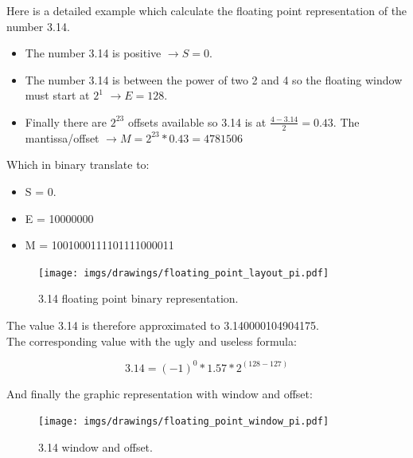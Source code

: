 \documentclass[book.tex]{subfiles}
\begin{document}
Here is a detailed example which calculate the floating point representation of the number 3.14.
\begin{itemize}
 \item The number 3.14 is positive  $\rightarrow S=0$.
 \item The number 3.14 is between the power of two 2 and 4 so the floating window must start at $2^1$  $\rightarrow E=128$.
 \item Finally there are $2^{23}$ offsets available so 3.14 is at $\frac{4-3.14}{2} = 0.43 $. The mantissa/offset $\rightarrow M = 2^{23}*0.43 = 4781506$
\end{itemize}

Which in binary translate to:

\begin{itemize}
\item S = 0.
\item E = 10000000
\item M = 1001000111101111000011
\end{itemize}

\begin{figure}[H]
\centering
\texttt{[image: imgs/drawings/floating\_point\_layout\_pi.pdf]}
\caption{3.14 floating point binary representation.}
\label{fig:fp_internals}
\end{figure}
  \bigskip

The value 3.14 is therefore approximated to 3.140000104904175.\\

The corresponding value with the ugly and useless formula:

\begin{equation}
3.14 = (-1)^0 * 1.57 * 2^{(128-127)}
\end{equation}

\bigskip

And finally the graphic representation with window and offset:\\

\begin{figure}[H]
\centering
\texttt{[image: imgs/drawings/floating\_point\_window\_pi.pdf]}

\caption{3.14 window and offset.}
\label{fig:fp_internals}
\end{figure}
  \bigskip
\end{document}
